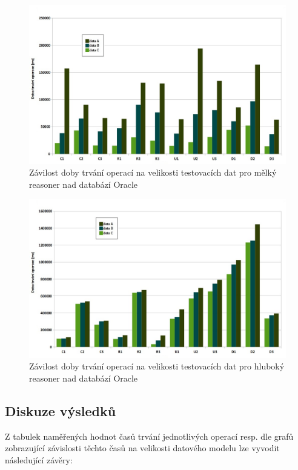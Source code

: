 \documentclass{projekt}
\begin{document}
\begin{figure}[htb!]
\begin{center}
\includegraphics[scale=0.45]{oracleShallow.jpg}
\caption{Závilost doby trvání operací na velikosti testovacích dat pro mělký reasoner nad databází Oracle}
\end{center}
\end{figure}


\begin{figure}[htb!]
\begin{center}
\includegraphics[scale=0.45]{oracleDeep.jpg}
\caption{Závilost doby trvání operací na velikosti testovacích dat pro hluboký reasoner nad databází Oracle}
\end{center}
\end{figure}

\newpage



\subsection{Diskuze výsledků}
\hspace{0.65cm}Z tabulek naměřených hodnot časů trvání jednotlivých operací resp. dle grafů zobrazující závislosti těchto časů na velikosti datového modelu lze vyvodit následující závěry:
\end{document}
